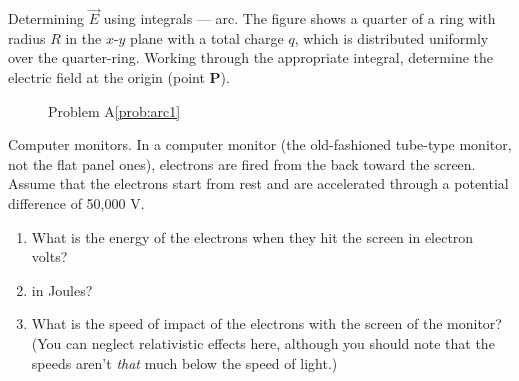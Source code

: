 \begin{aproblem}{Determining $\vec{E}$ using integrals --- arc.}  
  The figure shows a quarter of a ring with radius $R$ in the $x$-$y$
  plane with a total charge $q$, which is distributed uniformly over
  the quarter-ring. Working through the appropriate integral,
  determine the electric field at the origin (point {\bf P}).
  \label{prob:arc1}

  \begin{figure}[h]
    \begin{center}
      \caption{Problem A\ref{prob:arc1}}
    \end{center}
  \end{figure}
\end{aproblem}

\newpage

\begin{aproblem}{Computer monitors.} 
  In a computer monitor (the old-fashioned tube-type monitor, not the
  flat panel ones), electrons are fired from the back toward the
  screen.  Assume that the electrons start from rest and are
  accelerated through a potential difference of 50,000 V.
   \begin{enumerate}
   \item What is the energy of the electrons when they hit the screen
     in electron volts?
   \item in Joules?  
   \item What is the speed of impact of the electrons with the screen
     of the monitor?  (You can neglect relativistic effects here,
     although you should note that the speeds aren't {\it that} much
     below the speed of light.)
   \end{enumerate}
   \label{prob:ComputerMonitors}
\end{aproblem}


